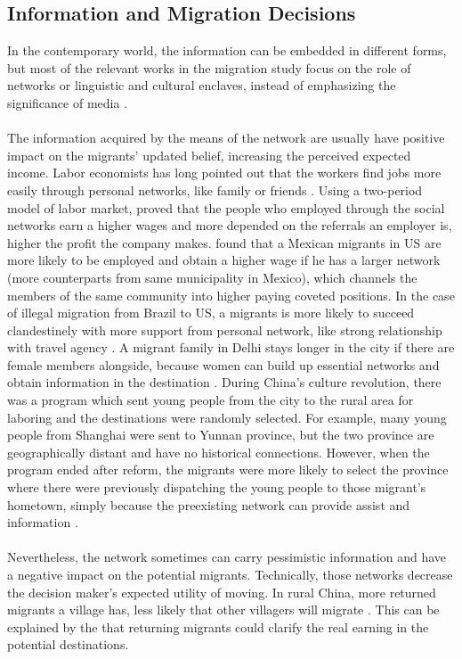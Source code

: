 \documentclass{article}
\begin{document}
\subsection{Information and Migration Decisions}
In the contemporary world, the information can be embedded in different forms, but  most of the relevant works in the migration study focus on the role of networks or linguistic and cultural enclaves, instead of emphasizing the significance of media \parencite{Wilson:2021wi}.
\\~\\
The information acquired by the means of the network are usually have positive impact on the migrants' updated belief, increasing the perceived expected income.  Labor economists has long pointed out that the workers find jobs more easily through personal networks, like family or friends \parencite{Corcoran:1980mf}. Using a two-period model of labor market, \textcite{Montgomery:1991sl} proved that the people who employed through the social networks earn a higher wages and more depended on the referrals an employer is, higher the profit the company makes. \textcite{Munshi:2003mn} found that a Mexican migrants in US are more likely to be employed and obtain a higher wage if he has a larger network (more counterparts from same municipality in Mexico), which channels the members of the same community into higher paying coveted positions. In the case of illegal migration from Brazil to US, a migrants is more likely to succeed clandestinely with more support from personal network, like strong relationship with travel agency \parencite{Fazito:2015fs}. A migrant family in Delhi stays longer in the city if there are female members alongside, because women can build up essential networks and obtain information in the destination \parencite{Neetha:2004nm}. During China's culture revolution, there was a program which sent young people from the city to the rural area for laboring and the destinations were randomly selected. For example, many young people from Shanghai were sent to Yunnan province, but the two province are geographically distant and have no historical connections. However, when the program ended after reform, the migrants were more likely to select the province where there were previously dispatching the young people to those migrant's hometown, simply because the preexisting network can provide assist and information \parencite{Kinnan:2018am}. 
\\~\\
Nevertheless, the network sometimes can carry pessimistic information and have a negative impact on the potential migrants. Technically, those networks decrease the decision maker's expected utility of moving. In rural China, more returned migrants a village has, less likely that other villagers  will migrate \parencite{Zhao:2003zr}. This can be explained by the that returning migrants could clarify the real earning in the potential destinations.
\end{document}
